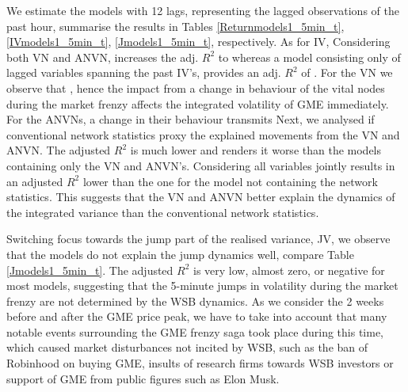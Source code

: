 We estimate the models with 12 lags, representing the lagged observations of the past hour,  summarise the results in Tables \ref{Returnmodels1_5min_t}, \ref{IVmodels1_5min_t},  \ref{Jmodels1_5min_t},  respectively.  As for IV,  Considering both VN and ANVN, increases the adj. $R^2$ to  whereas a model consisting only of lagged variables spanning the past IV's, provides an adj. $R^2$ of . For the VN we observe that , hence the impact from a change in behaviour of the vital nodes during the market frenzy affects the integrated volatility of GME immediately.  For the ANVNs, a change in their behaviour transmits  Next, we analysed if conventional network statistics proxy the explained movements from the VN and ANVN. The adjusted $R^2$ is much lower and renders it worse than the models containing only the VN and ANVN's. Considering all variables jointly results in an adjusted $R^2$ lower than the one for the model not containing the network statistics. This suggests that the VN and ANVN better explain the dynamics of the integrated variance than the conventional network statistics. 

Switching focus towards the jump part of the realised variance, JV, we observe that the models do not explain the jump dynamics well, compare Table \ref{Jmodels1_5min_t}. The adjusted $R^2$ is very low, almost zero, or negative for most models, suggesting that the 5-minute jumps in volatility during the market frenzy are not determined by the WSB dynamics. As we consider the 2 weeks before and after the GME price peak, we have to take into account that many notable events surrounding the GME frenzy saga took place during this time, which caused market disturbances not incited by WSB, such as the ban of Robinhood on buying GME, insults of research firms towards WSB investors or support of GME from public figures such as Elon Musk. 

